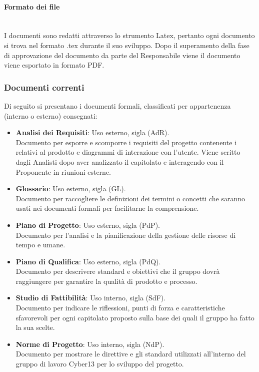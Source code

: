     \paragraph{Formato dei file}
    ~\\
    I documenti sono redatti attraverso lo strumento Latex, pertanto ogni documento si trova nel formato .tex durante il suo sviluppo. Dopo il superamento della fase di approvazione del documento da parte del Responsabile viene il documento viene esportato in formato PDF.
         
\subsubsection{Documenti correnti}
Di seguito si presentano i documenti formali, classificati per appartenenza (interno o esterno) consegnati:
    \begin{itemize}
        \item \textbf{Analisi dei Requisiti}: Uso esterno, sigla (AdR).\\
              Documento per esporre e scomporre i requisiti del progetto contenente i
               relativi  al  prodotto  e  diagrammi  di  interazione  con  l’utente.   Viene scritto dagli Analisti dopo aver analizzato il capitolato e interagendo con il Proponente in riunioni esterne.
        \item \textbf{Glossario}: Uso esterno, sigla (GL). \\
              Documento per raccogliere le definizioni dei termini o concetti che saranno usati nei documenti formali per facilitarne la comprensione.
        \item \textbf{Piano di Progetto}: Uso esterno, sigla (PdP). \\
              Documento  per  l’analisi  e  la  pianificazione  della  gestione  delle  risorse  di tempo e umane.
        \item \textbf{Piano di Qualifica}: Uso esterno, sigla (PdQ). \\
              Documento per descrivere standard e obiettivi che il gruppo dovrà raggiungere per garantire la qualità di prodotto e processo.
        \item \textbf{Studio di Fattibilità}: Uso interno, sigla (SdF).\\
              Documento per indicare le riflessioni, punti di forza e caratteristiche sfavorevoli per ogni capitolato proposto sulla base dei quali il gruppo ha fatto la sua scelte.
        \item \textbf{Norme di Progetto}: Uso interno, sigla (NdP).\\
              Documento per mostrare le direttive e gli standard utilizzati all’interno del gruppo di lavoro Cyber13 per lo sviluppo del progetto.
    \end{itemize}

